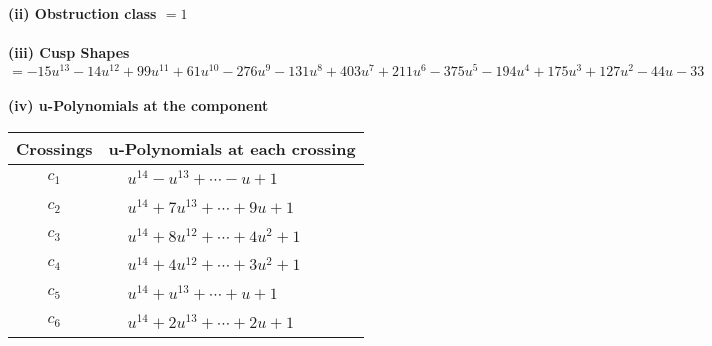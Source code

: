 \documentclass[1p]{elsarticle_modified}
\theoremstyle{definition}
\begin{document}
\flushleft \textbf{(ii) Obstruction class $= 1$}\\~\\
\flushleft \textbf{(iii) Cusp Shapes $= -15 u^{13}-14 u^{12}+99 u^{11}+61 u^{10}-276 u^9-131 u^8+403 u^7+211 u^6-375 u^5-194 u^4+175 u^3+127 u^2-44 u-33$}\\~\\
\newpage\renewcommand{\arraystretch}{1}
\flushleft \textbf{(iv) u-Polynomials at the component}\newline \\
\begin{tabular}{m{50pt}|m{274pt}}
Crossings & \hspace{64pt}u-Polynomials at each crossing \\
\hline $$\begin{aligned}c_{1}\end{aligned}$$&$\begin{aligned}
&u^{14}- u^{13}+\cdots- u+1
\end{aligned}$\\
\hline $$\begin{aligned}c_{2}\end{aligned}$$&$\begin{aligned}
&u^{14}+7 u^{13}+\cdots+9 u+1
\end{aligned}$\\
\hline $$\begin{aligned}c_{3}\end{aligned}$$&$\begin{aligned}
&u^{14}+8 u^{12}+\cdots+4 u^2+1
\end{aligned}$\\
\hline $$\begin{aligned}c_{4}\end{aligned}$$&$\begin{aligned}
&u^{14}+4 u^{12}+\cdots+3 u^2+1
\end{aligned}$\\
\hline $$\begin{aligned}c_{5}\end{aligned}$$&$\begin{aligned}
&u^{14}+u^{13}+\cdots+u+1
\end{aligned}$\\
\hline $$\begin{aligned}c_{6}\end{aligned}$$&$\begin{aligned}
&u^{14}+2 u^{13}+\cdots+2 u+1
\end{aligned}$\\

\end{tabular}
\end{document}
